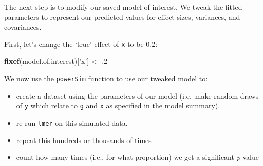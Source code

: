 \documentclass[]{article}
\newenvironment{Shaded}{\begin{snugshade}}{\end{snugshade}}
\newcommand{\ControlFlowTok}[1]{\textcolor[rgb]{0.13,0.29,0.53}{\textbf{#1}}}
\newcommand{\DecValTok}[1]{\textcolor[rgb]{0.00,0.00,0.81}{#1}}
\newcommand{\FloatTok}[1]{\textcolor[rgb]{0.00,0.00,0.81}{#1}}
\newcommand{\KeywordTok}[1]{\textcolor[rgb]{0.13,0.29,0.53}{\textbf{#1}}}
\newcommand{\NormalTok}[1]{#1}
\newcommand{\OperatorTok}[1]{\textcolor[rgb]{0.81,0.36,0.00}{\textbf{#1}}}
\newcommand{\StringTok}[1]{\textcolor[rgb]{0.31,0.60,0.02}{#1}}
\providecommand{\tightlist}{%
  \setlength{\itemsep}{0pt}\setlength{\parskip}{0pt}}
\begin{document}
The next step is to modify our saved model of interest. We tweak the fitted
parameters to represent our predicted values for effect sizes, variances, and
covariances.

First, let's change the `true' effect of \texttt{x} to be 0.2:

\begin{Shaded}
\begin{Highlighting}[]
\KeywordTok{fixef}\NormalTok{(model.of.interest)[}\StringTok{'x'}\NormalTok{] <-}\StringTok{ }\FloatTok{.2}
\end{Highlighting}
\end{Shaded}

We now use the \texttt{powerSim} function to use our tweaked model to:

\begin{itemize}
\tightlist
\item
  create a dataset using the parameters of our model (i.e.~make random draws
  of \texttt{y} which relate to \texttt{g} and \texttt{x} as specified in the model summary).
\item
  re-run \texttt{lmer} on this simulated data.
\item
  repeat this hundreds or thousands of times
\item
  count how many times (i.e., for what proportion) we get a significant \emph{p}
  value
\end{itemize}

\begin{Shaded}
\end{Shaded}
\end{document}
